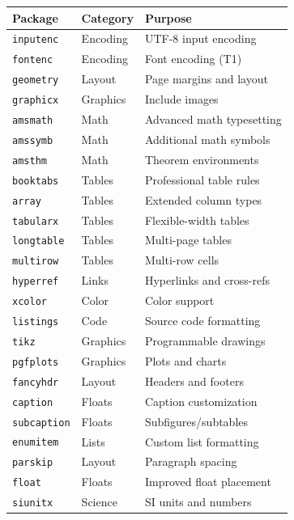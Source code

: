 \begin{longtable}{lp{4cm}p{6cm}}
\toprule
\textbf{Package} & \textbf{Category} & \textbf{Purpose} \\
\midrule
\endhead
\bottomrule
\endlastfoot

\texttt{inputenc}  & Encoding   & UTF-8 input encoding \\
\texttt{fontenc}   & Encoding   & Font encoding (T1) \\
\texttt{geometry}  & Layout     & Page margins and layout \\
\texttt{graphicx}  & Graphics   & Include images \\
\texttt{amsmath}   & Math       & Advanced math typesetting \\
\texttt{amssymb}   & Math       & Additional math symbols \\
\texttt{amsthm}    & Math       & Theorem environments \\
\texttt{booktabs}  & Tables     & Professional table rules \\
\texttt{array}     & Tables     & Extended column types \\
\texttt{tabularx}  & Tables     & Flexible-width tables \\
\texttt{longtable} & Tables     & Multi-page tables \\
\texttt{multirow}  & Tables     & Multi-row cells \\
\texttt{hyperref}  & Links      & Hyperlinks and cross-refs \\
\texttt{xcolor}    & Color      & Color support \\
\texttt{listings}  & Code       & Source code formatting \\
\texttt{tikz}      & Graphics   & Programmable drawings \\
\texttt{pgfplots}  & Graphics   & Plots and charts \\
\texttt{fancyhdr}  & Layout     & Headers and footers \\
\texttt{caption}   & Floats     & Caption customization \\
\texttt{subcaption}& Floats     & Subfigures/subtables \\
\texttt{enumitem}  & Lists      & Custom list formatting \\
\texttt{parskip}   & Layout     & Paragraph spacing \\
\texttt{float}     & Floats     & Improved float placement \\
\texttt{siunitx}   & Science    & SI units and numbers \\

\end{longtable}
